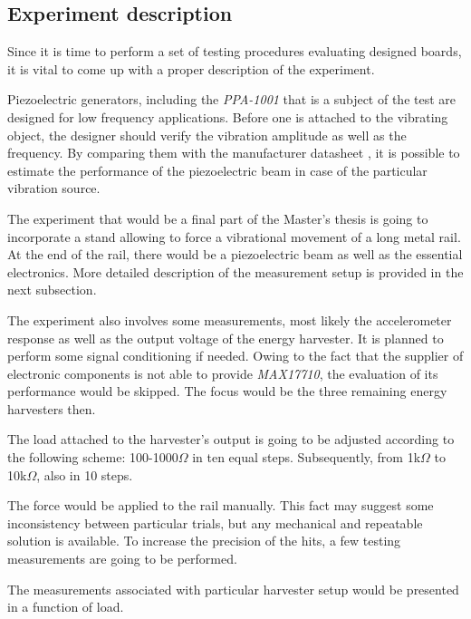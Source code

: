 \documentclass[12pt,a4paper]{article}
\begin{document}
\subsection{Experiment description}

Since it is time to perform a set of testing procedures evaluating designed boards, it is vital to come up with a proper description of the experiment.
\par
Piezoelectric generators, including the \textit{PPA-1001} that is a subject of the test are designed for low frequency applications. Before one is attached to the vibrating object, the designer should verify the vibration amplitude as well as the frequency. By comparing them with the manufacturer datasheet \cite{PPA}, it is possible to estimate the performance of the piezoelectric beam in case of the particular vibration source.
\par
The experiment that would be a final part of the Master's thesis is going to incorporate a stand allowing to force a vibrational movement of a long metal rail. At the end of the rail, there would be a piezoelectric beam as well as the essential electronics. More detailed description of the measurement setup is provided in the next subsection.
\par
The experiment also involves some measurements, most likely the accelerometer response as well as the output voltage of the energy harvester. It is planned to perform some signal conditioning if needed.
Owing to the fact that the supplier of electronic components is not able to provide \textit{MAX17710}, the evaluation of its performance would be skipped. The focus would be the three remaining energy harvesters then.
\par
The load attached to the harvester's output is going to be adjusted according to the following scheme: 100-1000$\Omega$ in ten equal steps. Subsequently, from 1k$\Omega$ to 10k$\Omega$, also in 10 steps.
\par
The force would be applied to the rail manually. This fact may suggest some inconsistency between particular trials, but any mechanical and repeatable solution is available. To increase the precision of the hits, a few testing measurements are going to be performed.
\par
The measurements associated with particular harvester setup would be presented in a function of load. 
\end{document}
